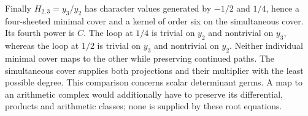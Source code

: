 Finally \(H_{2,3}=y_3/y_2\) has character values generated by
\(-1/2\) and \(1/4\), hence a four-sheeted minimal cover and a kernel
of order six on the simultaneous cover.  Its fourth power is \(C\).
The loop at \(1/4\) is trivial on \(y_2\) and nontrivial on \(y_3\),
whereas the loop at \(1/2\) is trivial on \(y_3\) and nontrivial on
\(y_2\).  Neither individual minimal cover maps to the other while
preserving continued paths.  The simultaneous cover supplies both
projections and their multiplier with the least possible degree.
This comparison concerns scalar determinant germs.  A map to an
arithmetic complex would additionally have to preserve its differential,
products and arithmetic classes; none is supplied by these root equations.
